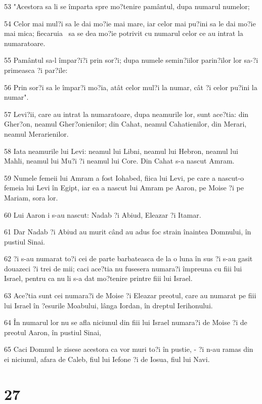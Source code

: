 \par 53 "Acestora sa li se împarta spre mo?tenire pamântul, dupa numarul numelor;
\par 54 Celor mai mul?i sa le dai mo?ie mai mare, iar celor mai pu?ini sa le dai mo?ie mai mica; fiecaruia  sa se dea mo?ie potrivit cu numarul celor ce au intrat la numaratoare.
\par 55 Pamântul sa-l împar?i?i prin sor?i; dupa numele semin?iilor parin?ilor lor sa-?i primeasca ?i par?ile:
\par 56 Prin sor?i sa le împar?i mo?ia, atât celor mul?i la numar, cât ?i celor pu?ini la numar".
\par 57 Levi?ii, care au intrat la numaratoare, dupa neamurile lor, sunt ace?tia: din Gher?on, neamul Gher?onienilor; din Cahat, neamul Cahatienilor, din Merari, neamul Merarienilor.
\par 58 Iata neamurile lui Levi: neamul lui Libni, neamul lui Hebron, neamul lui Mahli, neamul lui Mu?i ?i neamul lui Core. Din Cahat s-a nascut Amram.
\par 59 Numele femeii lui Amram a fost Iohabed, fiica lui Levi, pe care a nascut-o femeia lui Levi în Egipt, iar ea a nascut lui Amram pe Aaron, pe Moise ?i pe Mariam, sora lor.
\par 60 Lui Aaron i s-au nascut: Nadab ?i Abiud, Eleazar ?i Itamar.
\par 61 Dar Nadab ?i Abiud au murit când au adus foc strain înaintea Domnului, în pustiul Sinai.
\par 62 ?i s-au numarat to?i cei de parte barbateasca de la o luna în sus ?i s-au gasit douazeci ?i trei de mii; caci ace?tia nu fusesera numara?i împreuna cu fiii lui Israel, pentru ca nu li s-a dat mo?tenire printre fiii lui Israel.
\par 63 Ace?tia sunt cei numara?i de Moise ?i Eleazar preotul, care au numarat pe fiii lui Israel în ?esurile Moabului, lânga Iordan, în dreptul Ierihonului.
\par 64 În numarul lor nu se afla niciunul din fiii lui Israel numara?i de Moise ?i de preotul Aaron, în pustiul Sinai,
\par 65 Caci Domnul le zisese acestora ca vor muri to?i în pustie, - ?i n-au ramas din ei niciunul, afara de Caleb, fiul lui Iefone ?i de Iosua, fiul lui Navi.

\chapter{27}

